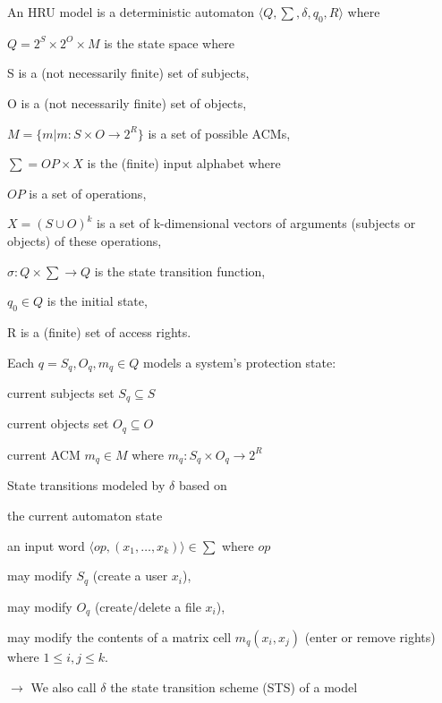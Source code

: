 \documentclass[a4paper]{article}
\begin{document}
\begin{multicols}{3}
    An HRU model is a deterministic automaton $\langle Q,\sum,\delta,q_0 ,R\rangle$ where
    \begin{itemize*}
        \item $Q= 2^S\times 2^O\times M$ is the state space where
        \begin{itemize*}
            \item S is a (not necessarily finite) set of subjects,
            \item O is a (not necessarily finite) set of objects,
            \item $M=\{m|m:S\times O\rightarrow 2^R\}$ is a set of possible ACMs,
        \end{itemize*}
        \item $\sum=OP\times X$ is the (finite) input alphabet where
        \begin{itemize*}
            \item $OP$ is a set of operations,
            \item $X=(S\cup O)^k$ is a set of k-dimensional vectors of arguments (subjects or objects) of these operations,
        \end{itemize*}
        \item $\sigma:Q\times\sum\rightarrow Q$ is the state transition function,
        \item $q_0\in Q$ is the initial state,
        \item R is a (finite) set of access rights.
        \item Each $q=S_q,O_q,m_q\in Q$ models a system’s protection state:
        \begin{itemize*}
            \item current subjects set $S_q\subseteq S$
            \item current objects set $O_q\subseteq O$
            \item current ACM $m_q\in M$ where $m_q:S_q\times O_q\rightarrow 2^R$
        \end{itemize*}
        \item State transitions modeled by $\delta$ based on
        \begin{itemize*}
            \item the current automaton state
            \item an input word $\langle op,(x_1,\dots ,x_k)\rangle \in\sum$ where $op$
            \item may modify $S_q$ (create a user $x_i$),
            \item may modify $O_q$ (create/delete a file $x_i$),
            \item may modify the contents of a matrix cell $m_q(x_i,x_j)$ (enter or remove rights) where $1\leq i,j\leq k$.
            \item[$\rightarrow$] We also call $\delta$ the state transition scheme (STS) of a model
        \end{itemize*}
    \end{itemize*}


\end{multicols}
\end{document}
